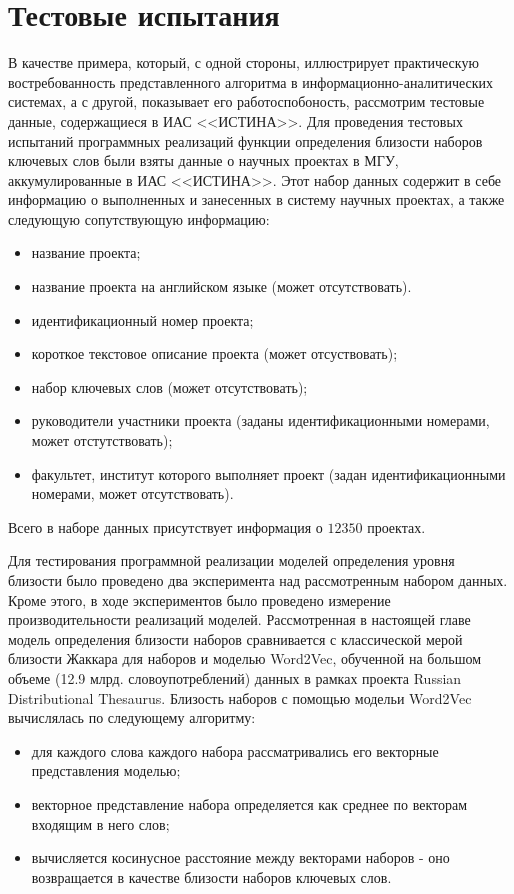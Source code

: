 \section{Тестовые испытания} \label{tuple_test}
В качестве примера, который, с одной стороны, иллюстрирует практическую востребованность представленного алгоритма в информационно-аналитических системах, а с другой, показывает его работоспобоность, рассмотрим тестовые данные, содержащиеся в ИАС <<ИСТИНА>>.
Для проведения тестовых испытаний программных реализаций функции определения близости наборов ключевых слов были взяты данные о научных проектах в МГУ, аккумулированные в ИАС <<ИСТИНА>>. Этот набор данных содержит в себе информацию о выполненных и занесенных в систему научных проектах, а также следующую сопутствующую информацию:
\begin{itemize}
    \item название проекта;
    \item название проекта на английском языке (может отсутствовать).
    \item идентификационный номер проекта;
    \item короткое текстовое описание проекта (может отсуствовать);
    \item набор ключевых слов (может отсутствовать);
    \item руководители участники проекта (заданы идентификационными номерами, может отстутствовать);
    \item факультет, институт которого выполняет проект (задан идентификационными номерами, может отсутствовать).
\end{itemize}

Всего в наборе данных присутствует информация о $12350$ проектах.

Для тестирования программной реализации моделей определения уровня близости было проведено два эксперимента над рассмотренным набором данных. Кроме этого, в ходе экспериментов было проведено измерение производительности реализаций моделей. Рассмотренная в настоящей главе модель определения близости наборов сравнивается с классической мерой близости Жаккара для наборов и моделью Word2Vec, обученной на большом объеме (12.9 млрд. словоупотреблений) данных в рамках проекта Russian Distributional Thesaurus. Близость наборов с помощью модельи Word2Vec вычислялась по следующему алгоритму:
\begin{itemize}
    \item для каждого слова каждого набора рассматривались его векторные представления моделью;
    \item векторное представление набора определяется как среднее по векторам входящим в него слов;
    \item вычисляется косинусное расстояние между векторами наборов - оно возвращается в качестве близости наборов ключевых слов.
\end{itemize}
        
